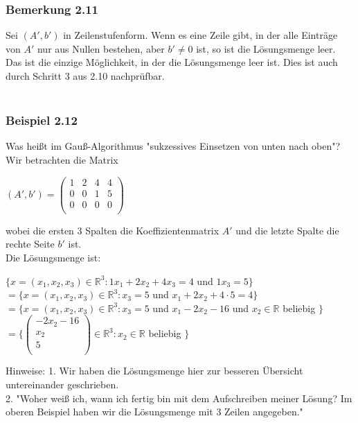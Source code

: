 \documentclass{article}
\begin{document}
\subsubsection*{Bemerkung 2.11}
Sei $(A',b')$ in Zeilenstufenform. Wenn es eine Zeile gibt, in der alle Einträge von $A'$ nur aus Nullen bestehen, aber $b' \neq 0$ ist, so ist die Lösungsmenge leer. \\
Das ist die einzige Möglichkeit, in der die Lösungsmenge leer ist. Dies ist auch durch Schritt 3 aus 2.10 nachprüfbar. \\
\\
\subsubsection*{Beispiel 2.12}
Was heißt im Gauß-Algorithmus "sukzessives Einsetzen von unten nach oben"? \\
Wir betrachten die Matrix \\
\begin{center}
    $(A',b') = \begin{pmatrix}
        1 & 2 & 4 & 4 \\
        0 & 0 & 1 & 5 \\
        0 & 0 & 0 & 0 \\
    \end{pmatrix}$
\end{center}
wobei die ersten 3 Spalten die Koeffizientenmatrix $A'$ und die letzte Spalte die rechte Seite $b'$ ist. \\
Die Lösungsmenge ist: \\
\begin{center}
    $\{x=(x_1, x_2, x_3) \in \mathbb{R}^3: 1x_1 + 2x_2 + 4x_3 = 4 $ und $ 1x_3 = 5\}$
    $= \{x=(x_1, x_2, x_3) \in \mathbb{R}^3: x_3=5 $ und $ x_1 + 2x_2 + 4 \cdot 5 = 4\}$
    $= \{x=(x_1, x_2, x_3) \in \mathbb{R}^3: x_3=5 $ und $ x_1 - 2x_2 - 16 $ und $ x_2 \in \mathbb{R} $ beliebig $\}$
    $=\{\begin{pmatrix}
        -2x_2 - 16 \\
        x_2 \\
        5 \\
    \end{pmatrix} \in \mathbb{R}^3: x_2 \in \mathbb{R} $ beliebig $\}$
\end{center}
Hinweise: 1. Wir haben die Lösungsmenge hier zur besseren Übersicht untereinander geschrieben. \\
2. "Woher weiß ich, wann ich fertig bin mit dem Aufschreiben meiner Lösung? Im oberen Beispiel haben wir die Lösungsmenge mit 3 Zeilen angegeben." \\
\end{document}
